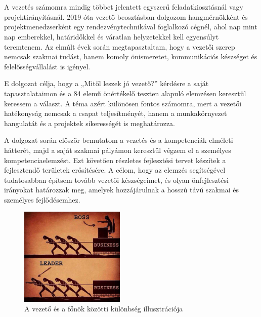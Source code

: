 \chapter{\bevezetes}
A vezetés számomra mindig többet jelentett egyszerű feladatkiosztásnál vagy projektirányításnál. 
2019 óta vezető beosztásban dolgozom hangmérnökként és projektmenedzserként egy rendezvénytechnikával foglalkozó cégnél, 
ahol nap mint nap emberekkel, határidőkkel és váratlan helyzetekkel kell egyensúlyt teremtenem. 
Az elmúlt évek során megtapasztaltam, hogy a vezetői szerep nemcsak szakmai tudást, hanem komoly önismeretet, 
kommunikációs készséget és felelősségvállalást is igényel. 

E dolgozat célja, hogy a „Mitől leszek jó vezető?” kérdésre a saját tapasztalataimon és a 84 elemű önértékelő 
teszten alapuló elemzésen keresztül keressem a választ. A téma azért különösen fontos számomra, mert a vezetői 
hatékonyság nemcsak a csapat teljesítményét, hanem a munkakörnyezet hangulatát és a projektek sikerességét is meghatározza.

A dolgozat során először bemutatom a vezetés és a kompetenciák elméleti hátterét, majd a saját szakmai pályámon 
keresztül végzem el a személyes kompetenciaelemzést. Ezt követően részletes fejlesztési tervet készítek a 
fejlesztendő területek erősítésére. A célom, hogy az elemzés segítségével tudatosabban építsem tovább vezetői 
készségeimet, és olyan önfejlesztési irányokat határozzak meg, 
amelyek hozzájárulnak a hosszú távú szakmai és személyes fejlődésemhez.

\begin{figure}[H]
	\centering
	\includegraphics[width=50mm, keepaspectratio]{figures/boss_leader.jpg}
	\caption{A vezető és a főnök közötti különbség illusztrációja}
	\label {fig:boss_leader}
\end{figure}
